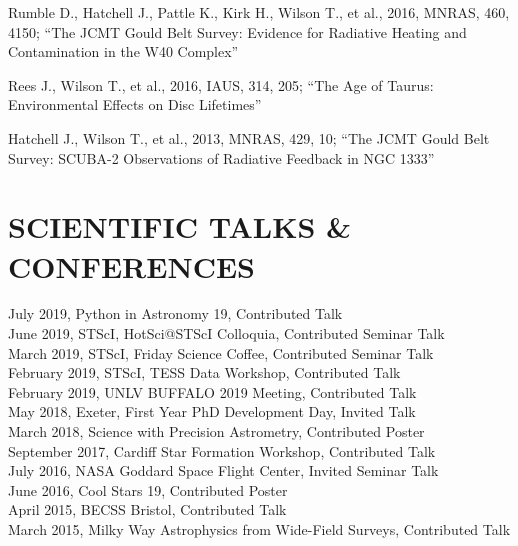 \documentclass[letter, margin, 10pt]{res} %
\begin{document}
\begin{resume}
Rumble D., Hatchell J., Pattle K., Kirk H., Wilson T., et al., 2016, MNRAS, 460, 4150; ``The JCMT Gould Belt Survey: Evidence for Radiative Heating and Contamination in the W40 Complex''

Rees J., Wilson T., et al., 2016, IAUS, 314, 205; ``The Age of Taurus: Environmental Effects on Disc Lifetimes''

Hatchell J., Wilson T., et al., 2013, MNRAS, 429, 10; ``The JCMT Gould Belt Survey: SCUBA-2 Observations of Radiative Feedback in NGC 1333''


\parskip \baselineskip
\section{SCIENTIFIC TALKS \& CONFERENCES}

July 2019, Python in Astronomy 19, Contributed Talk\\
June 2019, STScI, HotSci@STScI Colloquia, Contributed Seminar Talk\\
March 2019, STScI, Friday Science Coffee, Contributed Seminar Talk\\
February 2019, STScI, TESS Data Workshop, Contributed Talk\\
February 2019, UNLV BUFFALO 2019 Meeting, Contributed Talk\\
May 2018, Exeter, First Year PhD Development Day, Invited Talk\\
March 2018, Science with Precision Astrometry, Contributed Poster\\
September 2017, Cardiff Star Formation Workshop, Contributed Talk\\
July 2016, NASA Goddard Space Flight Center, Invited Seminar Talk\\
June 2016, Cool Stars 19, Contributed Poster\\
April 2015, BECSS Bristol, Contributed Talk\\
March 2015, Milky Way Astrophysics from Wide-Field Surveys, Contributed Talk\\

 

\end{resume}
\end{document}
